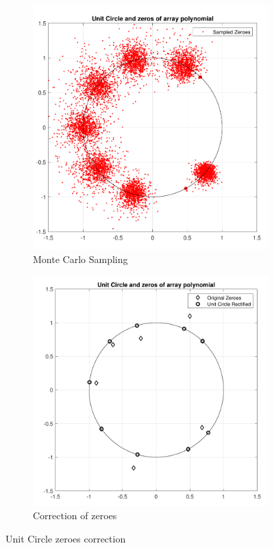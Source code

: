 \documentclass[12pt]{article}
\begin{document}
\begin{figure}[H]
    \centering
    \begin{subfigure}[b]{0.4\linewidth}
        \includegraphics[width=.9\linewidth]{paper/figures/uc_monte_carlo.pdf}
        \caption{Monte Carlo Sampling}
        \label{fig:uc_monte_carlo}
    \end{subfigure}\hspace{0.09\linewidth}
    \begin{subfigure}[b]{0.4\linewidth}
        \includegraphics[width=.9\linewidth]{paper/figures/uc_corrected.pdf}
        \caption{Correction of zeroes}
        \label{fig:uc_corrected}
    \end{subfigure}
    \caption{Unit Circle zeroes correction}
    \label{fig:mpdr_robust_k}
\end{figure}
\end{document}
